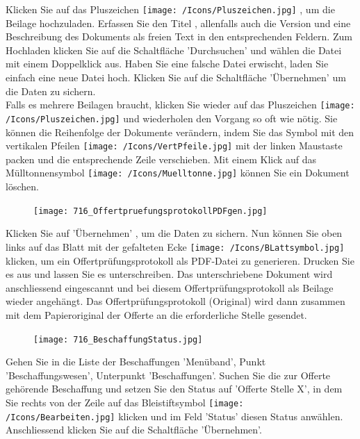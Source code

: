 Klicken Sie auf das Pluszeichen \texttt{[image: /Icons/Pluszeichen.jpg]} , um die Beilage hochzuladen. Erfassen Sie den Titel , allenfalls auch die Version  und eine Beschreibung des Dokuments  als freien Text in den entsprechenden Feldern. Zum Hochladen klicken Sie auf die Schaltfläche 'Durchsuchen'  und wählen die Datei mit einem Doppelklick aus. Haben Sie eine falsche Datei erwischt, laden Sie einfach eine neue Datei hoch. Klicken Sie auf die Schaltfläche 'Übernehmen' um die Daten zu sichern. \\
Falls es mehrere Beilagen braucht, klicken Sie wieder auf das Pluszeichen \texttt{[image: /Icons/Pluszeichen.jpg]}  und wiederholen den Vorgang so oft wie nötig. Sie können die Reihenfolge der Dokumente verändern, indem Sie das Symbol mit den vertikalen Pfeilen \texttt{[image: /Icons/VertPfeile.jpg]}  mit der linken Maustaste packen und die entsprechende Zeile verschieben. Mit einem Klick auf das Mülltonnensymbol \texttt{[image: /Icons/Muelltonne.jpg]}  können Sie ein Dokument löschen.

\vspace{\baselineskip}

\begin{figure}
\vspace{-15pt}
\texttt{[image: 716\_OffertpruefungsprotokollPDFgen.jpg]}
\end{figure}
Klicken Sie auf 'Übernehmen' , um die Daten zu sichern. Nun können Sie oben links auf das
Blatt mit der gefalteten Ecke \texttt{[image: /Icons/BLattsymbol.jpg]} klicken, um ein Offertprüfungsprotokoll als PDF-Datei zu generieren. Drucken Sie es aus und lassen Sie es unterschreiben. Das unterschriebene Dokument wird anschliessend eingescannt und bei diesem Offertprüfungsprotokoll als
Beilage wieder angehängt. Das Offertprüfungsprotokoll (Original) wird dann zusammen mit dem Papieroriginal der Offerte an die erforderliche Stelle gesendet.

\vspace{\baselineskip}

\begin{figure}
\vspace{-15pt}
\texttt{[image: 716\_BeschaffungStatus.jpg]}
\end{figure}
Gehen Sie in die Liste der Beschaffungen 'Menüband', Punkt 'Beschaffungswesen', Unterpunkt 'Beschaffungen'. Suchen Sie die zur Offerte gehörende
Beschaffung und setzen Sie den Status auf 'Offerte Stelle X', in dem Sie rechts von der Zeile auf das Bleistiftsymbol \texttt{[image: /Icons/Bearbeiten.jpg]} klicken und im Feld 'Status' diesen Status anwählen. Anschliessend klicken Sie auf die Schaltfläche 'Übernehmen'.

